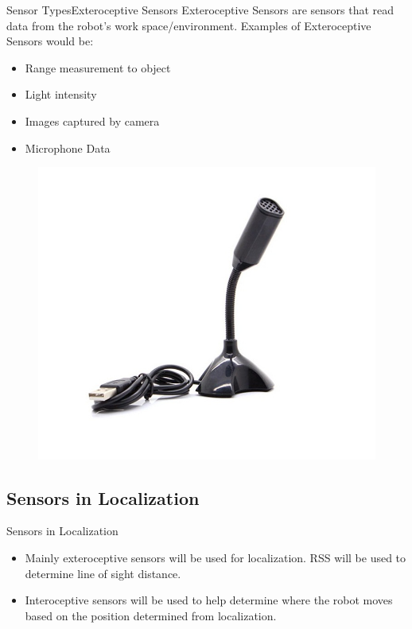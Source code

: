 \documentclass{beamer}
\begin{document}
\begin{frame}{Sensor Types}{Exteroceptive Sensors}
Exteroceptive Sensors are sensors that read data from the robot's work space/environment. Examples of Exteroceptive Sensors would be:
\begin{itemize}
\item Range measurement to object
\item Light intensity
\item Images captured by camera
\item Microphone Data
\end{itemize}
\begin{figure}
\centering
\includegraphics[scale=0.4]{figs/img/Lu_Images/microphone}
\end{figure}
  
\end{frame}

\subsection{Sensors in Localization}
\begin{frame}{Sensors in Localization}
\begin{itemize}
\item
Mainly exteroceptive sensors will be used for localization. RSS will be used to determine line of sight distance.
\item
Interoceptive sensors will be used to help determine where the robot moves based on the position determined from localization.
\end{itemize}


\end{frame}
\end{document}
